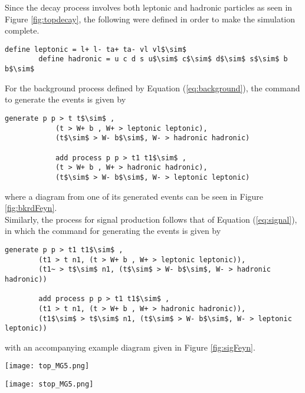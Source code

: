 Since the decay process involves both leptonic and hadronic particles as seen in Figure \ref{fig:topdecay}, the following were defined in order to make the simulation complete. \\

\begin{lstlisting}[mathescape = true]
        define leptonic = l+ l- ta+ ta- vl vl$\sim$
        define hadronic = u c d s u$\sim$ c$\sim$ d$\sim$ s$\sim$ b b$\sim$
\end{lstlisting}

For the background process defined by Equation (\ref{eq:background}), the command to generate the events is given by
\begin{lstlisting}[mathescape = true]
            generate p p > t t$\sim$ , 
            (t > W+ b , W+ > leptonic leptonic), 
            (t$\sim$ > W- b$\sim$, W- > hadronic hadronic)
        
            add process p p > t1 t1$\sim$ ,
            (t > W+ b , W+ > hadronic hadronic), 
            (t$\sim$ > W- b$\sim$, W- > leptonic leptonic)
\end{lstlisting}
where a diagram from one of its generated events can be seen in Figure \ref{fig:bkrdFeyn}. \\

Similarly, the process for signal production follows that of Equation (\ref{eq:signal}), in which the command for generating the events is given by
\begin{lstlisting}[mathescape = true]
        generate p p > t1 t1$\sim$ ,
        (t1 > t n1, (t > W+ b , W+ > leptonic leptonic)),
        (t1~ > t$\sim$ n1, (t$\sim$ > W- b$\sim$, W- > hadronic hadronic))
        
        add process p p > t1 t1$\sim$ , 
        (t1 > t n1, (t > W+ b , W+ > hadronic hadronic)), 
        (t1$\sim$ > t$\sim$ n1, (t$\sim$ > W- b$\sim$, W- > leptonic leptonic))
\end{lstlisting}
with an accompanying example diagram given in Figure \ref{fig:sigFeyn}. \\

\noindent\begin{minipage}{\textwidth}
\centering
  \begin{minipage}[htbp]{0.45\textwidth}
    \centering
    \texttt{[image: top\_MG5.png]}
    \label{fig:bkrdFeyn}
  \end{minipage}
  \hfill
  \begin{minipage}[htbp]{0.45\textwidth}
    \centering
    \texttt{[image: stop\_MG5.png]}
    \label{fig:sigFeyn}
  \end{minipage}
\end{minipage}
